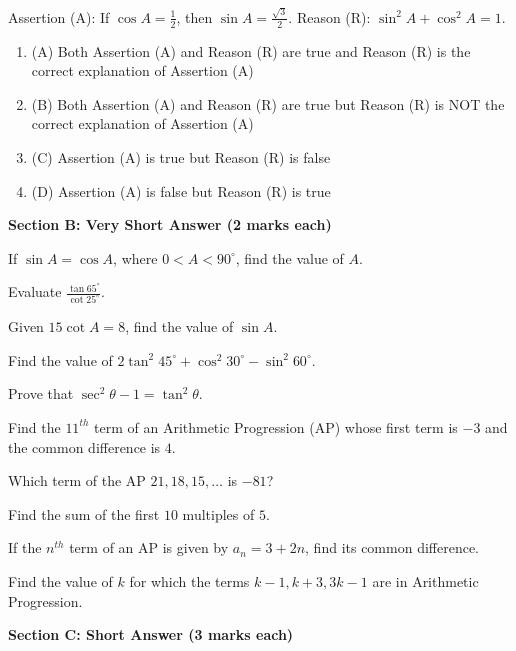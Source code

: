 \documentclass[12pt,a4paper]{exam}
\begin{document}
\begin{questions}
\question[1] Assertion (A): If $\cos A = \frac{1}{2}$, then $\sin A = \frac{\sqrt{3}}{2}$. Reason (R): $\sin^2 A + \cos^2 A = 1$.
\begin{enumerate}[label=(\Alph*)]
  \item (A) Both Assertion (A) and Reason (R) are true and Reason (R) is the correct explanation of Assertion (A)
  \item (B) Both Assertion (A) and Reason (R) are true but Reason (R) is NOT the correct explanation of Assertion (A)
  \item (C) Assertion (A) is true but Reason (R) is false
  \item (D) Assertion (A) is false but Reason (R) is true
\end{enumerate}
\vspace{0.15cm}

\end{questions}
\bigskip
\noindent\textbf{\large Section B: Very Short Answer (2 marks each)}

\begin{questions}
\question[2] If $\sin A = \cos A$, where $0 < A < 90^\circ$, find the value of $A$.
\vspace{0.15cm}

\question[2] Evaluate $\frac{\tan 65^\circ}{\cot 25^\circ}$.
\vspace{0.15cm}

\question[2] Given $15 \cot A = 8$, find the value of $\sin A$.
\vspace{0.15cm}

\question[2] Find the value of $2 \tan^2 45^\circ + \cos^2 30^\circ - \sin^2 60^\circ$.
\vspace{0.15cm}

\question[2] Prove that $\sec^2 \theta - 1 = \tan^2 \theta$.
\vspace{0.15cm}

\question[2] Find the $11^{th}$ term of an Arithmetic Progression (AP) whose first term is $-3$ and the common difference is $4$.
\vspace{0.15cm}

\question[2] Which term of the AP $21, 18, 15, \dots$ is $-81$?
\vspace{0.15cm}

\question[2] Find the sum of the first $10$ multiples of $5$.
\vspace{0.15cm}

\question[2] If the $n^{th}$ term of an AP is given by $a_n = 3 + 2n$, find its common difference.
\vspace{0.15cm}

\question[2] Find the value of $k$ for which the terms $k-1, k+3, 3k-1$ are in Arithmetic Progression.
\vspace{0.15cm}

\end{questions}
\bigskip
\noindent\textbf{\large Section C: Short Answer (3 marks each)}
\end{document}
